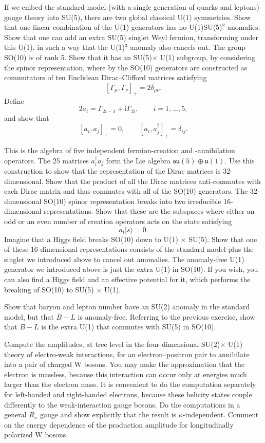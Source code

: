 \begin{banksproblems}
If we embed the standard-model (with a single generation of quarks and
leptons) gauge theory into SU(5), there are two global classical U(1)
symmetries. Show that one linear combination of the U(1) generators has no
U(1)SU(5)$^2$ anomalies. Show that one can add an extra SU(5) singlet Weyl
fermion, transforming under this U(1), in such a way that the U(1)$^3$
anomaly also cancels out. The group SO(10) is of rank 5. Show that it has an
SU(5)$\times$ U(1) subgroup, by considering the spinor representation, where
by the SO(10) generators are constructed as commutators of ten Euclidean
Dirac--Clifford matrices satisfying
\[
  [\Gamma_\mu,\Gamma_\nu]_+=2\delta_{\mu\nu} .
\]
Define
\[
  2a_i=\Gamma_{2i-1}+\mathrm{i}\Gamma_{2i},
  \qquad i=1,\ldots,5,
\]
and show that
\[
  [a_i,a_j]_+=0,\qquad [a_i,a_j^\dagger]_+=\delta_{ij} .
\]

This is the algebra of five independent fermion-creation and -annihilation
operators. The 25 matrices $a_i^\dagger a_j$ form the Lie algebra
$\mathfrak{su}(5)\oplus\mathfrak{u}(1)$. Use this construction to show that
the representation of the Dirac matrices is 32-dimensional. Show that the
product of all the Dirac matrices anti-commutes with each Dirac matrix and
thus commutes with all of the SO(10) generators. The 32-dimensional SO(10)
spinor representation breaks into two irreducible 16-dimensional
representations. Show that these are the subspaces where either an odd or an
even number of creation operators acts on the state satisfying
\[
  a_i|s\rangle=0 .
\]
Imagine that a Higgs field breaks SO(10) down to U(1) $\times$ SU(5). Show
that one of these 16-dimensional representations consists of the standard
model plus the singlet we introduced above to cancel out anomalies. The
anomaly-free U(1) generator we introduced above is just the extra U(1) in
SO(10). If you wish, you can also find a Higgs field and an effective
potential for it, which performs the breaking of SO(10) to SU(5) $\times$ U(1).

Show that baryon and lepton number have an SU(2) anomaly in the standard
model, but that $B-L$ is anomaly-free. Referring to the previous exercise,
show that $B-L$ is the extra U(1) that commutes with SU(5) in SO(10).

Compute the amplitudes, at tree level in the four-dimensional SU(2)$\times$ U(1) theory of
electro-weak interactions, for an electron--positron pair to annihilate into a
pair of charged W bosons. You may make the approximation that the electron is
massless, because this interaction can occur only at energies much larger than
the electron mass. It is convenient to do the computation separately for
left-handed and right-handed electrons, because these helicity states couple
differently to the weak-interaction gauge bosons. Do the computations in a
general $R_\kappa$ gauge and show explicitly that the result is
$\kappa$-independent. Comment on the energy dependence of the production
amplitude for longitudinally polarized W bosons.


\end{banksproblems}
